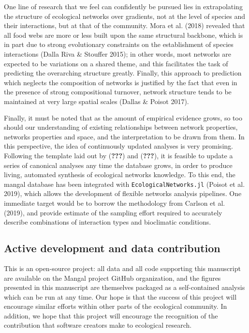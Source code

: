 One line of research that we feel can confidently be pursued lies in
extrapolating the structure of ecological networks over gradients, not
at the level of species and their interactions, but at that of the
community. Mora et al. (2018) revealed that all food webs are more or
less built upon the same structural backbone, which is in part due to
strong evolutionary constraints on the establishment of species
interactions (Dalla Riva \& Stouffer 2015); in other words, most
networks are expected to be variations on a shared theme, and this
facilitates the task of predicting the overarching structure greatly.
Finally, this approach to prediction which neglects the composition of
networks is justified by the fact that even in the presence of strong
compositional turnover, network structure tends to be maintained at very
large spatial scales (Dallas \& Poisot 2017).

Finally, it must be noted that as the amount of empirical evidence
grows, so too should our understanding of existing relationships between
network properties, networks properties and space, and the
interpretation to be drawn from them. In this perspective, the idea of
continuously updated analyses is very promising. Following the template
laid out by ({\textbf{???}}) and ({\textbf{???}}), it is feasible to
update a series of canonical analyses any time the database grows, in
order to produce living, automated synthesis of ecological networks
knowledge. To this end, the mangal database has been integrated with
\texttt{EcologicalNetworks.jl} (Poisot et al. 2019), which allows the
development of flexible networks analysis pipelines. One immediate
target would be to borrow the methodology from Carlson et al. (2019),
and provide estimate of the sampling effort required to accurately
describe combinations of interaction types and bioclimatic conditions.

\hypertarget{active-development-and-data-contribution}{%
\subsection{Active development and data
contribution}\label{active-development-and-data-contribution}}

This is an open-source project: all data and all code supporting this
manuscript are available on the Mangal project GitHub organization, and
the figures presented in this manuscript are themselves packaged as a
self-contained analysis which can be run at any time. Our hope is that
the success of this project will encourage similar efforts within other
parts of the ecological community. In addition, we hope that this
project will encourage the recognition of the contribution that software
creators make to ecological research.

